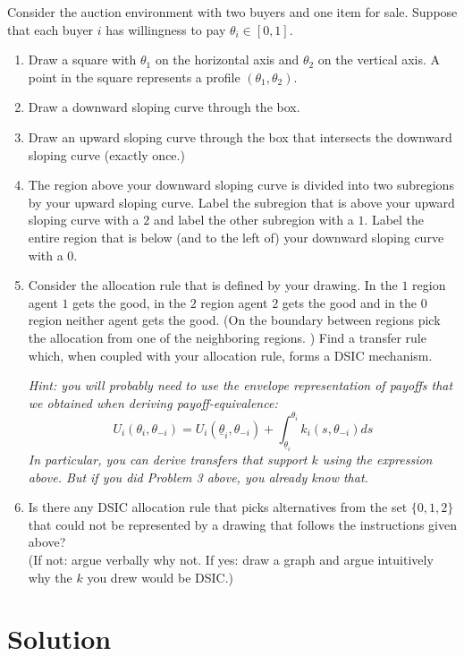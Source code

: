 \documentclass[a4paper]{article}
\newif\ifsolutions
\begin{document}
Consider the auction environment with two buyers and one item for sale. Suppose that each buyer $i$ has willingness to pay $\theta_i \in [0,1].$
\begin{enumerate}
	\item Draw a square with $\theta_1$ on the horizontal axis and $\theta_2$ on the vertical axis.  A point in the square
	represents a profile $(\theta_1, \theta_2)$.
	\item Draw a downward sloping curve through the box.
	\item Draw an upward sloping curve through the box that intersects the downward sloping curve (exactly once.)
	\item The region above your downward sloping curve is divided into two subregions by your upward sloping curve.  Label
	the subregion that is above your upward sloping curve with a $2$ and label the other subregion with a $1$.  Label
	the entire region that is below (and to the left of) your downward sloping curve with a $0$.
	\item Consider the allocation rule that is defined by your drawing.  In the $1$ region agent $1$ gets the
	good, in the $2$ region agent $2$ gets the good and in the $0$ region neither agent gets the good.  (On the boundary
	between regions pick the allocation from one of the neighboring regions. )  Find a transfer rule which, when
	coupled with your allocation rule, forms a DSIC mechanism.
	
	\emph{Hint: you will probably need to use the envelope representation of payoffs that we obtained when deriving payoff-equivalence:}
	\begin{equation*}
		U_i(\theta_i, \theta_{-i}) = U_i (\underline{\theta}_i,\theta_{-i}) + \int_{\underline{\theta}_i}^{\theta_i} k_i(s,\theta_{-i}) d s
	\end{equation*}
	\emph{In particular, you can derive transfers that support $k$ using the expression above. But if you did Problem 3 above, you already know that.}
	
	\item Is there any DSIC allocation rule that picks alternatives from the set $\{0,1,2\}$ that could not be represented by a drawing that follows the instructions given above?
	\\
	(If not: argue verbally why not. If yes: draw a graph and argue intuitively why the $k$ you drew would be DSIC.)
\end{enumerate}

\ifsolutions
\section*{Solution}
\end{document}
